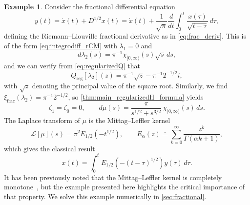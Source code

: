 \documentclass{cams-l} %
\newcommand{\cL}{\mathcal L}
\theoremstyle{definition}
\newtheorem{example}[theorem]{Example}
\theoremstyle{remark}
\numberwithin{equation}{section}
\begin{document}
\begin{example}\label{ex:fractional}
    Consider the fractional differential equation
    \[y(t) = \dot{x}(t) + D^{1/2}x(t)= \dot{x}(t) + \frac{1}{\sqrt{\pi}}\frac{d}{dt}\int_0^t \frac{x(\tau)}{\sqrt{t-\tau}}\,d\tau,\]
    defining the Riemann--Liouville fractional derivative as in \cref{eq:frac_deriv}. This is of the form \ref{eq:integrodiff_rCM} with $\lambda_1=0$ and 
    \[d\lambda_2(s) = \pi^{-1}\chi_{[0,\infty)}(s)\sqrt{s}\,ds,\]
    and we can verify from \cref{eq:regularizedQ} that
    \[Q_\mathrm{reg}[\lambda_2](z) = \pi^{-1}\sqrt{z} - \pi^{-1}2^{-1/2}i,\]
    with $\sqrt{z}$ denoting the principal value of the square root. Similarly, we find $\xi_\mathrm{frac}(\lambda_2) = \pi^{-1}2^{-1/2}$, so \cref{thm:main_regularizedH_formula} yields 
    \[\zeta_1 = \zeta_0 = 0,\qquad d\mu(s) = \frac{\pi}{s^{1/2}+s^{3/2}}\,\chi_{[0,\infty)}(s)\,ds.\]
    The Laplace transform of $\mu$ is the Mittag--Leffler kernel~\cite{haubold2011mittag}
    \begin{equation}\label{eq:mittagleffler}
        \cL[\mu](s) = \pi^2 E_{1/2}(-t^{1/2}),\qquad E_\alpha(z) \doteq \sum_{k=0}^\infty \frac{z^k}{\Gamma(\alpha k + 1)},
    \end{equation}
    which gives the classical result~\cite[Sec.~7]{haubold2011mittag}
    \[x(t) = \int_0^t E_{1/2}(-(t-\tau)^{1/2})y(\tau)\,d\tau.\]
    It has been previously noted that the Mittag--Leffler kernel is completely monotone~\cite{miller1999note}, but the example presented here highlights the critical importance of that property. We solve this example numerically in \cref{sec:fractional}.
\end{example}
\end{document}
